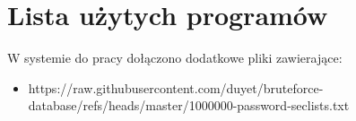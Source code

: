 \chapter{Lista użytych programów} 

W systemie do pracy dołączono dodatkowe pliki zawierające:
\begin{itemize}
\item https://raw.githubusercontent.com/duyet/bruteforce-database/refs/heads/master/1000000-password-seclists.txt
\end{itemize}
